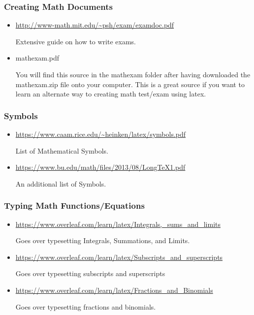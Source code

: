 		\subsubsection{Creating Math Documents}
			\begin{itemize}
				\item \url{http://www-math.mit.edu/~psh/exam/examdoc.pdf}
					\begin{absquote}
						Extensive guide on how to write exams.  
					\end{absquote}
				\item mathexam.pdf
					\begin{absquote}
						You will find this source in the mathexam folder after having downloaded the mathexam.zip file onto your computer. This is a great source if you want to learn an alternate way to creating math test/exam using latex.
					\end{absquote}
			\end{itemize}
		\subsubsection{Symbols}
			\begin{itemize}
				\item \url{https://www.caam.rice.edu/~heinken/latex/symbols.pdf}
					\begin{absquote}
						List of Mathematical Symbols.
					\end{absquote}
				\item \url{https://www.bu.edu/math/files/2013/08/LongTeX1.pdf}
					\begin{absquote}
						An additional list of  Symbols.
					\end{absquote}
			\end{itemize}
		\subsubsection{Typing Math Functions/Equations}
			\begin{itemize}
				\item \url{https://www.overleaf.com/learn/latex/Integrals,_sums_and_limits}
					\begin{absquote}
						Goes over typesetting Integrals, Summations, and Limits.
					\end{absquote}
				\item \url{https://www.overleaf.com/learn/latex/Subscripts_and_superscripts}
					\begin{absquote}
						Goes over typesetting subscripts and superscripts
					\end{absquote}
				\item \url{https://www.overleaf.com/learn/latex/Fractions_and_Binomials}
					\begin{absquote}
						Goes over typesetting fractions and binomials.
					\end{absquote}
			\end{itemize}
